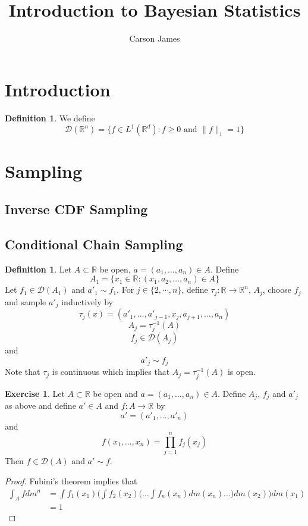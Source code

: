 \documentclass[12pt]{amsart}
\theoremstyle{definition}
\newtheorem{defn}[definition]{Definition}
\theoremstyle{remark}
\theoremstyle{definition}
\newtheorem{ex}[definition]{Exercise}
\newcommand{\R}{\mathbb{R}}
\newcommand{\MD}{\mathcal{D}}
\begin{document}
	
	\title{Introduction to Bayesian Statistics}
	\author{Carson James}
	\maketitle
	
	\tableofcontents
	
	\section{Introduction}
	\begin{defn}
		We define $$\MD(\R^n) = \{f \in L^1(\R^d) : f \geq 0 \text{ and } \|f\|_1 = 1\}$$
	\end{defn}
	
	\section{Sampling}
	
	\subsection{Inverse CDF Sampling}
	
	\subsection{Conditional Chain Sampling}
	\begin{defn}
	Let $A \subset \R$ be open, $a = (a_1, \dots, a_n) \in A$. Define $$A_1 = \{x_1 \in \R: (x_1, a_2, \dots, a_n) \in A\}$$ Let $f_1 \in \MD(A_1)$ and $a'_1 \sim f_1$. For $j \in \{2, \cdots, n\}$, define $\tau_j: \R \rightarrow \R^n$, $A_j$, choose $f_j$ and sample $a'_j$ inductively by 
	$$\tau_j(x) = (a'_1, \dots, a'_{j-1}, x_j, a_{j+1}, \dots, a_n)$$  
	$$A_j = \tau_j^{-1}(A)$$ 
	$$f_j \in \MD(A_j)$$ 
	and
	$$a'_j \sim f_j$$ 
	Note that $\tau_j$ is continuous which implies that $A_j = \tau_j^{-1}(A)$ is open.
	
	\end{defn}	
	
	\begin{ex}
	Let $A \subset \R$ be open and $a = (a_1, \dots, a_n) \in A$. Define $A_j$, $f_j$ and $a'_j$ as above and define $a' \in A$ and $f: A \rightarrow \R$ by $$a' = (a'_1, \dots, a'_n)$$ and  $$f(x_1, \dots, x_n) = \prod_{j=1}^nf_j(x_j)$$ 
	Then $f \in \MD(A)$ and $a' \sim f$.
	\end{ex}
	
	\begin{proof}
	Fubini's theorem implies that 
	\begin{align*}
	\int_A f dm^n 
	&= \int f_1(x_1) \bigg( \int f_2(x_2) \bigg( \dots \int f_n(x_n) dm(x_n) \dots \bigg) dm(x_2) \bigg) dm(x_1) \\
	&= 1
	\end{align*}
	\end{proof}
	
\end{document}
